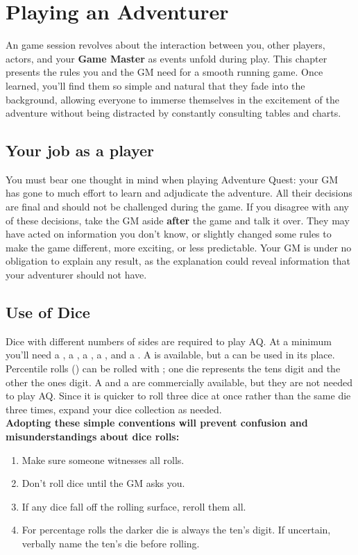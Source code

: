 \chapter{Playing an Adventurer}
\label{ch:play-adventurer}
An \aq game session revolves about the interaction between you, other players, actors, and your \textbf{Game Master} as events unfold during play. This chapter presents the rules you and the GM need for a smooth running game. Once learned, you'll find them so simple and natural that they fade into the background, allowing everyone to immerse themselves in the excitement of the adventure without being distracted by constantly consulting tables and charts.
\setlength{\columnsep}{\defcolwidth}
\begin{multicols*}{2}
\section{Your job as a player}
You must bear one thought in mind when playing Adventure Quest: your GM has gone to much effort to learn and adjudicate the adventure. All their decisions are final and
should not be challenged during the game. If you disagree with any of these decisions, take the GM aside \textbf{after} the game and talk it over. They may have acted on information you don't know, or slightly changed some rules to make the game  different, more exciting, or less predictable. Your GM is under no obligation to explain any result, as the explanation could reveal information that your adventurer should not have.
\section{Use of Dice}
Dice with different numbers of sides are required to play AQ. At a minimum you'll need a , a , a , a , and a . A  is available, but a  can be used in its
place. Percentile rolls () can be rolled with  ; one die represents the tens digit and the other the ones digit. A  and a  are commercially available, but they are not needed to play AQ. Since it is quicker to roll three dice at once rather
than the same die three times, expand your dice collection as needed.\\
\textbf{Adopting these simple conventions will prevent confusion and misunderstandings about dice rolls:}
\begin{enumerate}
\item Make sure someone witnesses all rolls.
\item Don't roll dice until the GM asks you.
\item If any dice fall off the rolling surface, reroll them all.
\item For percentage rolls the darker die is always the ten's digit. If uncertain, verbally name the ten's die before rolling.
\end{enumerate}

\end{multicols*}
